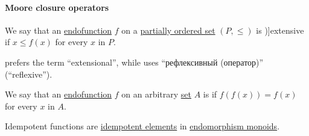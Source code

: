 \paragraph{Moore closure operators}

\begin{definition}\label{def:extensive_function}
  We say that an \hyperref[def:function/endofunction]{endofunction} \( f \) on a \hyperref[def:partially_ordered_set]{partially ordered set} \( (P, \leq) \) is \term[en=extensive (\cite[111]{Birkhoff1967LatticeTheory})]{extensive} if \( x \leq f(x) \) for every \( x \) in \( P \).
\end{definition}
\begin{comments}
  \item {} prefers the term \enquote{extensional}, while  uses \enquote{рефлексивный (оператор)} (\enquote{reflexive}).
\end{comments}

\begin{definition}\label{def:idempotent_function}
  We say that an \hyperref[def:function/endofunction]{endofunction} \( f \) on an arbitrary \hyperref[def:set]{set} \( A \) is  if \( f(f(x)) = f(x) \) for every \( x \) in \( A \).
\end{definition}
\begin{comments}
  \item Idempotent functions are \hyperref[def:monoid_idempotent]{idempotent elements} in \hyperref[def:endomorphism_monoid]{endomorphism monoids}.
\end{comments}

